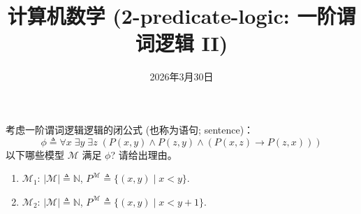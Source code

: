 \documentclass[a4paper, justified]{tufte-handout}
\title{计算机数学 (2-predicate-logic: 一阶谓词逻辑 II)}
\date{2026年3月30日}
\begin{document}
\maketitle
\noplagiarism %
\begin{abstract}
\end{abstract}
\beginrequired

\newpage
\begin{problem}
  考虑一阶谓词逻辑逻辑的闭公式 (也称为语句; sentence)：
  \[
    \phi \triangleq \forall x\; \exists y\; \exists z\;
      (P(x, y) \land P(z, y) \land (P(x, z) \to P(z, x)))
  \]
  以下哪些模型 $\mathcal{M}$ 满足 $\phi$? 请给出理由。
  \begin{enumerate}[(1)]
    \item $\mathcal{M}_{1}$:
      $|\mathcal{M}| \triangleq \mathbb{N}$,
      $P^{\mathcal{M}} \triangleq \{(x, y) \mid x < y\}$.
    \item $\mathcal{M}_{2}$:
      $|\mathcal{M}| \triangleq \mathbb{N}$,
      $P^{\mathcal{M}} \triangleq \{(x, y) \mid x < y + 1\}$.
  \end{enumerate}
\end{problem}
\end{document}
